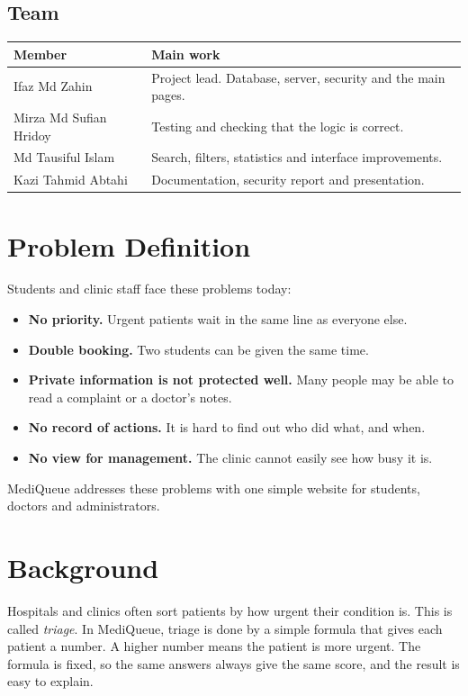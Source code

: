 \documentclass[12pt,a4paper]{article}
\begin{document}
\subsection{Team}
\begin{center}
\begin{tabular}{@{}p{4cm}p{10cm}@{}}
\toprule
\textbf{Member} & \textbf{Main work}\\
\midrule
Ifaz Md Zahin & Project lead. Database, server, security and the main pages.\\
Mirza Md Sufian Hridoy  & Testing and checking that the logic is correct.\\
Md Tausiful Islam & Search, filters, statistics and interface improvements.\\
Kazi Tahmid Abtahi & Documentation, security report and presentation.\\
\bottomrule
\end{tabular}
\end{center}

\section{Problem Definition}
Students and clinic staff face these problems today:
\begin{itemize}
  \item \textbf{No priority.} Urgent patients wait in the same line as everyone else.
  \item \textbf{Double booking.} Two students can be given the same time.
  \item \textbf{Private information is not protected well.} Many people may be able to read a complaint or a doctor's notes.
  \item \textbf{No record of actions.} It is hard to find out who did what, and when.
  \item \textbf{No view for management.} The clinic cannot easily see how busy it is.
\end{itemize}
MediQueue addresses these problems with one simple website for students, doctors and administrators.

\section{Background}
Hospitals and clinics often sort patients by how urgent their condition is. This is called \emph{triage}. In MediQueue, triage is done by a simple formula that gives each patient a number. A higher number means the patient is more urgent. The formula is fixed, so the same answers always give the same score, and the result is easy to explain.
\end{document}
